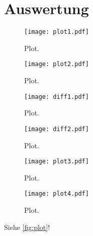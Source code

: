 \section{Auswertung}
\label{sec:Auswertung}

\begin{figure}
  \centering
  \texttt{[image: plot1.pdf]}
  \caption{Plot.}
  \label{fig:plot}
\end{figure}

\begin{figure}
  \centering
  \texttt{[image: plot2.pdf]}
  \caption{Plot.}
  \label{fig:plot}
\end{figure}

\begin{figure}
  \centering
  \texttt{[image: diff1.pdf]}
  \caption{Plot.}
  \label{fig:plot}
\end{figure}

\begin{figure}
  \centering
  \texttt{[image: diff2.pdf]}
  \caption{Plot.}
  \label{fig:plot}
\end{figure}


\begin{figure}
  \centering
  \texttt{[image: plot3.pdf]}
  \caption{Plot.}
  \label{fig:plot}
\end{figure}


\begin{figure}
  \centering
  \texttt{[image: plot4.pdf]}
  \caption{Plot.}
  \label{fig:plot}
\end{figure}



Siehe \autoref{fig:plot}!
